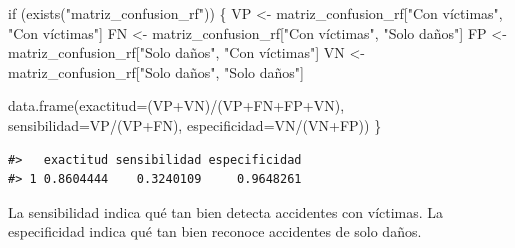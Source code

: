 \documentclass[
  spanish,
  10.5pt,
  letterpaper,
  openany,
  headings=big]{scrbook}
\newenvironment{Shaded}{}{}
\newcommand{\AttributeTok}[1]{\textcolor[rgb]{0.84,0.23,0.29}{#1}}
\newcommand{\ControlFlowTok}[1]{\textcolor[rgb]{0.84,0.23,0.29}{#1}}
\newcommand{\FunctionTok}[1]{\textcolor[rgb]{0.44,0.26,0.76}{#1}}
\newcommand{\NormalTok}[1]{\textcolor[rgb]{0.14,0.16,0.18}{#1}}
\newcommand{\OtherTok}[1]{\textcolor[rgb]{0.44,0.26,0.76}{#1}}
\newcommand{\SpecialCharTok}[1]{\textcolor[rgb]{0.00,0.36,0.77}{#1}}
\newcommand{\StringTok}[1]{\textcolor[rgb]{0.01,0.18,0.38}{#1}}
\begin{document}
\begin{Shaded}
\begin{Highlighting}[]
\ControlFlowTok{if}\NormalTok{ (}\FunctionTok{exists}\NormalTok{(}\StringTok{"matriz\_confusion\_rf"}\NormalTok{)) \{}
\NormalTok{  VP }\OtherTok{\textless{}{-}}\NormalTok{ matriz\_confusion\_rf[}\StringTok{"Con víctimas"}\NormalTok{, }\StringTok{"Con víctimas"}\NormalTok{]}
\NormalTok{  FN }\OtherTok{\textless{}{-}}\NormalTok{ matriz\_confusion\_rf[}\StringTok{"Con víctimas"}\NormalTok{, }\StringTok{"Solo daños"}\NormalTok{]}
\NormalTok{  FP }\OtherTok{\textless{}{-}}\NormalTok{ matriz\_confusion\_rf[}\StringTok{"Solo daños"}\NormalTok{, }\StringTok{"Con víctimas"}\NormalTok{]}
\NormalTok{  VN }\OtherTok{\textless{}{-}}\NormalTok{ matriz\_confusion\_rf[}\StringTok{"Solo daños"}\NormalTok{, }\StringTok{"Solo daños"}\NormalTok{]}

  \FunctionTok{data.frame}\NormalTok{(}\AttributeTok{exactitud=}\NormalTok{(VP}\SpecialCharTok{+}\NormalTok{VN)}\SpecialCharTok{/}\NormalTok{(VP}\SpecialCharTok{+}\NormalTok{FN}\SpecialCharTok{+}\NormalTok{FP}\SpecialCharTok{+}\NormalTok{VN), }\AttributeTok{sensibilidad=}\NormalTok{VP}\SpecialCharTok{/}\NormalTok{(VP}\SpecialCharTok{+}\NormalTok{FN), }\AttributeTok{especificidad=}\NormalTok{VN}\SpecialCharTok{/}\NormalTok{(VN}\SpecialCharTok{+}\NormalTok{FP))}
\NormalTok{\}}
\end{Highlighting}
\end{Shaded}

\begin{verbatim}
#>   exactitud sensibilidad especificidad
#> 1 0.8604444    0.3240109     0.9648261
\end{verbatim}

\begin{tcolorbox}[enhanced jigsaw, arc=.35mm, bottomrule=.15mm, bottomtitle=1mm, breakable, colback=white, colbacktitle=quarto-callout-tip-color!10!white, colframe=quarto-callout-tip-color-frame, coltitle=black, left=2mm, leftrule=.75mm, opacityback=0, opacitybacktitle=0.6, rightrule=.15mm, title=\textcolor{quarto-callout-tip-color}{\faLightbulb}\hspace{0.5em}{Interpretación del resultado}, titlerule=0mm, toprule=.15mm, toptitle=1mm]

La sensibilidad indica qué tan bien detecta accidentes con víctimas. La
especificidad indica qué tan bien reconoce accidentes de solo daños.

\end{tcolorbox}
\end{document}
